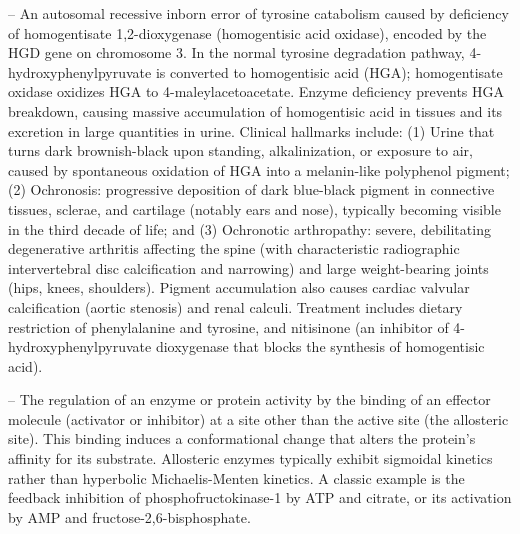 -- An autosomal recessive inborn error of tyrosine catabolism caused by deficiency of homogentisate 1,2-dioxygenase (homogentisic acid oxidase), encoded by the HGD gene on chromosome 3. In the normal tyrosine degradation pathway, 4-hydroxyphenylpyruvate is converted to homogentisic acid (HGA); homogentisate oxidase oxidizes HGA to 4-maleylacetoacetate. Enzyme deficiency prevents HGA breakdown, causing massive accumulation of homogentisic acid in tissues and its excretion in large quantities in urine. Clinical hallmarks include: (1) Urine that turns dark brownish-black upon standing, alkalinization, or exposure to air, caused by spontaneous oxidation of HGA into a melanin-like polyphenol pigment; (2) Ochronosis: progressive deposition of dark blue-black pigment in connective tissues, sclerae, and cartilage (notably ears and nose), typically becoming visible in the third decade of life; and (3) Ochronotic arthropathy: severe, debilitating degenerative arthritis affecting the spine (with characteristic radiographic intervertebral disc calcification and narrowing) and large weight-bearing joints (hips, knees, shoulders). Pigment accumulation also causes cardiac valvular calcification (aortic stenosis) and renal calculi. Treatment includes dietary restriction of phenylalanine and tyrosine, and nitisinone (an inhibitor of 4-hydroxyphenylpyruvate dioxygenase that blocks the synthesis of homogentisic acid).

-- The regulation of an enzyme or protein activity by the binding of an effector molecule (activator or inhibitor) at a site other than the active site (the allosteric site). This binding induces a conformational change that alters the protein's affinity for its substrate. Allosteric enzymes typically exhibit sigmoidal kinetics rather than hyperbolic Michaelis-Menten kinetics. A classic example is the feedback inhibition of phosphofructokinase-1 by ATP and citrate, or its activation by AMP and fructose-2,6-bisphosphate.

